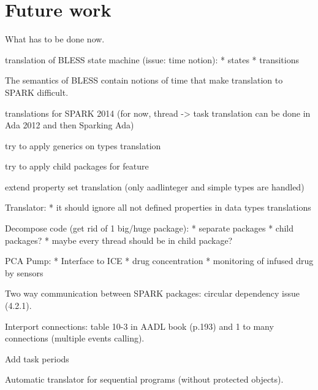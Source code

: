 
\cleardoublepage

\chapter{Future work}
\label{future_work}

What has to be done now.

translation of BLESS state machine (issue: time notion):
	* states
	* transitions

The semantics of BLESS contain notions of time that make translation to SPARK difficult.

translations for SPARK 2014 (for now, thread -> task translation can be done in Ada 2012 and then Sparking Ada)

try to apply generics on types translation

try to apply child packages for feature 

extend property set translation (only aadlinteger and simple types are handled)

Translator:
* it should ignore all not defined properties in data types translations

Decompose code (get rid of 1 big/huge package):
* separate packages
* child packages?
* maybe every thread should be in child package?

PCA Pump:
* Interface to ICE
* drug concentration
* monitoring of infused drug by sensors

Two way communication between SPARK packages: circular dependency issue (4.2.1).

Interport connections: table 10-3 in AADL book (p.193) and 1 to many connections (multiple events calling).

Add task periods

Automatic translator for sequential programs (without protected objects).